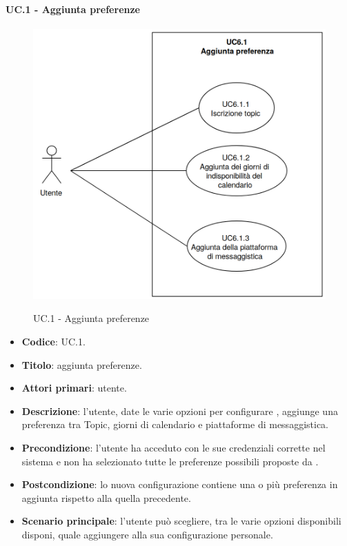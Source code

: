 	\paragraph{UC\theuccount.1 - Aggiunta preferenze}
		\begin{figure}[H]
			\centering
			\includegraphics[width=\columnwidth]{img/UC6_1.png}\\
			\caption{UC\theuccount.1 - Aggiunta preferenze}
		\end{figure}
	\begin{itemize}
		\item \textbf{Codice}: UC\theuccount.1.
		\item \textbf{Titolo}: aggiunta preferenze.
		\item \textbf{Attori primari}: utente.
		\item \textbf{Descrizione}: l'utente, date le varie opzioni per configurare \progetto, aggiunge una preferenza tra Topic, giorni di calendario e piattaforme di messaggistica.
		\item \textbf{Precondizione}: l'utente ha acceduto con le sue credenziali corrette nel sistema e non ha selezionato tutte le preferenze possibili proposte da \progetto.
		\item \textbf{Postcondizione}: lo nuova configurazione contiene una o più preferenza in aggiunta rispetto alla quella precedente.
		\item \textbf{Scenario principale}: l'utente può scegliere, tra le varie opzioni disponibili disponi, quale aggiungere alla sua configurazione personale.
	\end{itemize}
	
